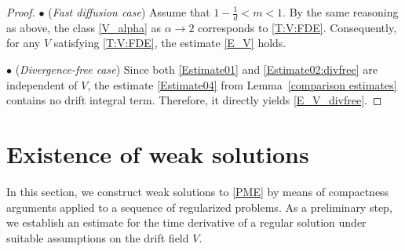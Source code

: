 \documentclass{amsart}
\numberwithin{equation}{section}
\begin{document}
\begin{proof}
$\bullet$ (\emph{Fast diffusion case}) Assume that $1-\frac{1}{d}<m<1$. By the same reasoning as above, the class \eqref{V_alpha} as $\alpha \to 2$ corresponds to \eqref{T:V:FDE}. Consequently, for any $V$ satisfying \eqref{T:V:FDE}, the estimate \eqref{E_V} holds. 


$\bullet$ (\emph{Divergence-free case})  
Since both \eqref{Estimate01} and \eqref{Estimate02:divfree} are independent of $V$, the estimate \eqref{Estimate04} from Lemma~\ref{comparison estimates} contains no drift integral term. Therefore, it directly yields \eqref{E_V_divfree}.
\end{proof}







\section{Existence of weak solutions}\label{S:Exist}




In this section, we construct weak solutions to \eqref{PME} by means of compactness arguments applied to a sequence of regularized problems. As a preliminary step, we establish an estimate for the time derivative of a regular solution under suitable assumptions on the drift field $V$.
\end{document}
